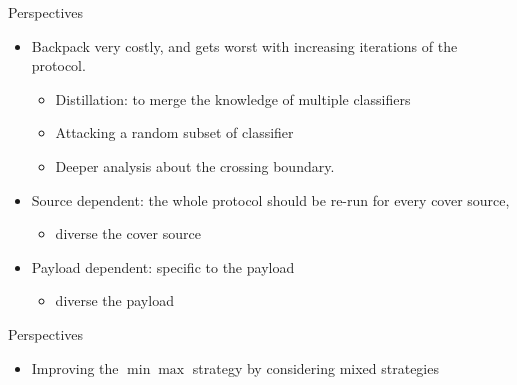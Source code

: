 \documentclass[10pt]{beamer}
\begin{document}
\begin{frame}{Perspectives}
    \begin{itemize}
        \item Backpack very costly, and gets worst with increasing iterations of the protocol. 
        \begin{itemize}
            \item Distillation: to merge the knowledge of multiple classifiers
            \item Attacking a random subset of classifier
            \item Deeper analysis about the crossing boundary.
        \end{itemize}
        \pause
    
        \item Source dependent: the whole protocol should be re-run for every cover source,     \begin{itemize}
                \item diverse the cover source
            \end{itemize}
            
        \pause 
        \item Payload dependent: specific to the payload
            \begin{itemize}
                \item diverse the payload
            \end{itemize}
        

    \end{itemize}

\end{frame}



\begin{frame}{Perspectives}
  
    \begin{itemize}
        \item Improving the $\min\max$ strategy by considering mixed strategies

    \end{itemize}

\end{frame}




\end{document}
